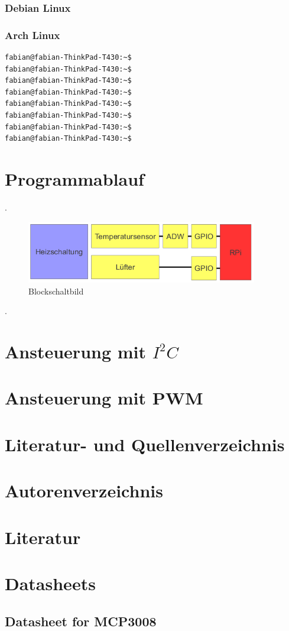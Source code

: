 \documentclass[12pt,a4paper]{article}
\begin{document}
\subsubsection{Debian Linux}
\subsubsection{Arch Linux}

\begin{lstlisting}[caption={ISO-to-SD},label=iso,language = bash] 
fabian@fabian-ThinkPad-T430:~$ 
fabian@fabian-ThinkPad-T430:~$ 
fabian@fabian-ThinkPad-T430:~$ 
fabian@fabian-ThinkPad-T430:~$ 
fabian@fabian-ThinkPad-T430:~$ 
fabian@fabian-ThinkPad-T430:~$ 
fabian@fabian-ThinkPad-T430:~$ 
fabian@fabian-ThinkPad-T430:~$ 
\end{lstlisting}

\section{Programmablauf}
.
\begin{figure}[htp]
\centering
\includegraphics[width=0.9\textwidth]{pics/block.png} 
\caption{Blockschaltbild}
\end{figure}
.

\section{Ansteuerung mit $I^2C$}

\section{Ansteuerung mit PWM}


\appendix
\newpage
\section{Literatur- und Quellenverzeichnis}

\listoffigures
\listoftables

\section*{Autorenverzeichnis}
\section*{Literatur}

\newpage
\section{Datasheets}
\subsection{Datasheet for MCP3008}


\end{document}
